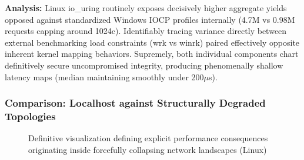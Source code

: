 \textbf{Analysis:} Linux io\_uring routinely exposes decisively higher aggregate yields opposed against standardized Windows IOCP profiles internally (4.7M vs 0.98M requests capping around 1024c). Identifiably tracing variance directly between external benchmarking load constraints (wrk vs winrk) paired effectively opposite inherent kernel mapping behaviors. Supremely, both individual components chart definitively secure uncompromised integrity, producing phenomenally shallow latency maps (median maintaining smoothly under 200$\mu$s).

\subsubsection{Comparison: Localhost against Structurally Degraded Topologies}

\begin{figure}[H]
\centering
{}
\caption{Definitive visualization defining explicit performance consequences originating inside forcefully collapsing network landscapes (Linux)}
\label{fig:network_degradation}
\end{figure}

